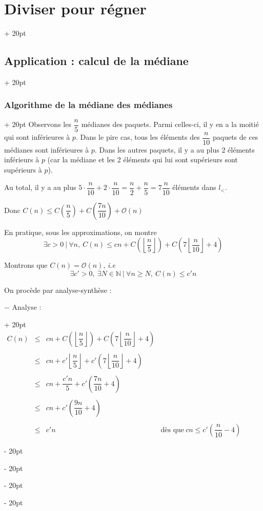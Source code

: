 \documentclass[a4paper, 12pt, twoside]{article}
\newcommand{\N}{\mathbb{N}} %
\newcommand{\lr}[1]{\left( #1 \right)}
\newcommand{\floor}[1]{\left\lfloor #1 \right\rfloor}
\renewcommand{\le}{\leqslant}
\renewcommand{\ge}{\geqslant}
\newcommand{\ind}[1][20pt]{\advance\leftskip + #1}
\newcommand{\deind}[1][20pt]{\advance\leftskip - #1}
\newenvironment{indt}[2][20pt]{#2 \par \ind[#1]}{\par \deind} %
\begin{document}
\begin{indt}{\section{Diviser pour régner}}
\begin{indt}{\subsection{Application : calcul de la médiane}}
\begin{indt}{\subsubsection{Algorithme de la médiane des médianes}}
                Observons les $\dfrac n 5$ médianes des paquets. Parmi celles-ci, il y en a la moitié qui sont inférieures à $p$. Dans le pire cas, tous les éléments des $\dfrac n {10}$ paquets de ces médianes sont inférieures à $p$. Dans les autres paquets, il y a au plus 2 éléments inférieurs à $p$ (car la médiane et les 2 éléments qui lui sont supérieurs sont supérieurs à $p$).
                
                Au total, il y a au plus $5 \cdot \dfrac n {10} + 2 \cdot \dfrac n {10} = \dfrac n 2 + \dfrac n 5 = 7\dfrac n {10}$ éléments dans $l_<$.
                
                Donc $C(n) \le C\lr{\dfrac n 5} + C\lr{\dfrac{7n}{10}} + \mathcal O(n)$
                
                En pratique, sous les approximations, on montre
                    \[ \exists c > 0\ |\ \forall n,\ C(n) \le cn + C\lr{\floor{\dfrac n 5}} + C\lr{7\floor{\dfrac n {10}} + 4} \]
                
                Montrons que $C(n) = \mathcal O(n)$, \textit{i.e}
                    \[ \exists c' > 0,\ \exists N \in \N\ |\ \forall n \ge N,\ C(n) \le c'n \]
                
                On procède par analyse-synthèse :
                
                \begin{indt}{$-$ Analyse :}
                    $
                        \begin{array}{rcll}
                            C(n) &\le& cn + C\lr{\floor{\dfrac n 5}} + C\lr{7\floor{\dfrac n {10}} + 4}
                            \\ \\
                            &\le& cn + c'\floor{\dfrac n 5} + c'\lr{7\floor{\dfrac n {10}} + 4}
                            \\ \\
                            &\le& cn + \dfrac{c'n}{5} + c'\lr{\dfrac{7n}{10} + 4}
                            \\ \\
                            &\le& cn + c'\lr{\dfrac{9n}{10} + 4}
                            \\ \\
                            &\le& c'n & \text{dès que}\ cn \le c'\lr{\dfrac n {10} - 4}
                        \end{array}
                    $
                    

\end{indt}
\end{indt}
\end{indt}
\end{indt}
\end{document}
